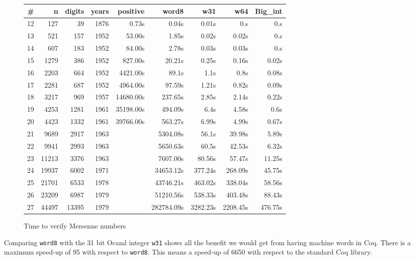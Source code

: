 \begin{figure}
\begin{center}
\begin{tabular}{|r|r|r|r|r|r|r|r|r |}
\hline
\# & n & digits & years &  positive & word8 & w31 & w64 & Big\_int\\
\hline
12 &  127 &  39 & 1876 &  0.73s & 0.04s & 0.01s & 0.s & 0.s \\
13 &  521 & 157 & 1952 &  53.00s & 1.85s & 0.02s & 0.02s &  0.s\\
14 &  607 & 183 & 1952 &  84.00s & 2.78s & 0.03s & 0.03s &  0.s\\
15 & 1279 & 386 & 1952 &  827.00s & 20.21s& 0.25s & 0.16s &  0.02s\\
16 & 2203 & 664 & 1952 &  4421.00s & 89.1s & 1.1s & 0.8s &  0.08s\\
17 & 2281 & 687 & 1952 &  4964.00s & 97.59s & 1.21s & 0.82s &  0.09s\\
18 & 3217 & 969 & 1957 &  14680.00s & 237.65s & 2.85s & 2.14s &  0.22s\\
19 & 4253 & 1281 & 1961 &35198.00s & 494.09s& 6.4s & 4.58s &  0.6s\\
20 & 4423 & 1332 & 1961 &  39766.00s & 563.27s & 6.99s & 4.99s &  0.67s\\
21 & 9689 & 2917  & 1963 &   & 5304.08s & 56.1s & 39.98s &  5.89s\\	 
22 & 9941 & 2993  & 1963 &   & 5650.63s & 60.5s & 42.53s &  6.32s\\	 
23 & 11213 & 3376 & 1963 &    & 7607.00s & 80.56s & 57.47s &  11.25s\\ 
24 & 19937 & 6002  & 1971 &  & 34653.12s & 377.24s & 268.09s &  45.75s\\
25 & 21701 & 6533 & 1978 &  &43746.21s & 463.02s & 338.04s &  58.56s \\
26 & 23209 & 6987 & 1979  &  &51210.56s & 538.33s & 403.48s &  88.43s\\
27 & 44497 & 13395 & 1979  &  &282784.09s & 3282.23s & 2208.45s &  476.75s \\
\hline

\end{tabular}
\end{center}
\caption{Time to verify Mersenne numbers}
\label{fig:Mersenne}
\end{figure}

Comparing {\tt word8} with the 31 bit {\sc Ocaml} integer {\tt w31} shows 
all the benefit we would get from having machine words in {\sc Coq}. 
There is a maximum speed-up of 95 with respect to {\tt word8}. This
means a speed-up of 6650 with respect to the standard {\sc Coq} library.

